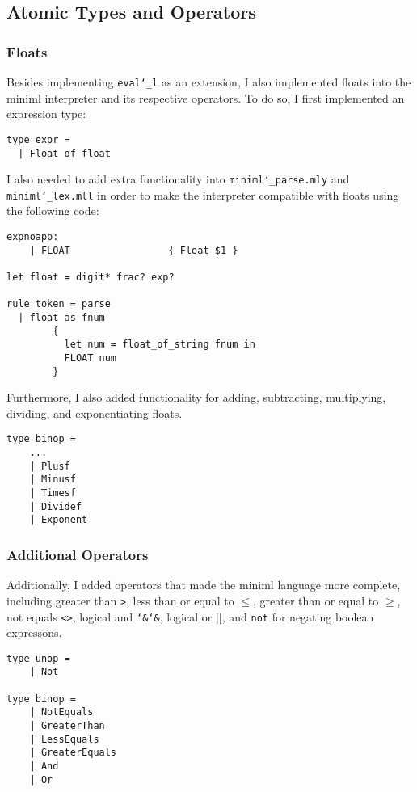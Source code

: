 \documentclass{article}
\begin{document}
\subsection{Atomic Types and Operators}

\subsubsection{Floats}

Besides implementing \texttt{eval\char`_l} as an extension, I also implemented floats into the miniml interpreter and its respective operators. To do so, I first implemented an expression type:

\begin{lstlisting}
type expr =      
  | Float of float
\end{lstlisting}

I also needed to add extra functionality into \texttt{miniml\char`_parse.mly} and \texttt{miniml\char`_lex.mll} in order to make the interpreter compatible with floats using the following code:

\begin{lstlisting}
expnoapp: 
    | FLOAT                 { Float $1 }

let float = digit* frac? exp?

rule token = parse
  | float as fnum 
        {
          let num = float_of_string fnum in 
          FLOAT num
        }
\end{lstlisting}

Furthermore, I also added functionality for adding, subtracting, multiplying, dividing, and exponentiating floats.

\begin{lstlisting}
type binop =
    ...
    | Plusf
    | Minusf
    | Timesf
    | Dividef
    | Exponent
\end{lstlisting}

\subsubsection{Additional Operators}

Additionally, I added operators that made the miniml language more complete, including greater than \texttt{>}, less than or equal to $\leq$, greater than or equal to $\geq$, not equals \texttt{<>}, logical and \texttt{\char`&\char`&}, logical or $||$, and \texttt{not} for negating boolean expressons.

\begin{lstlisting}
type unop =
    | Not

type binop = 
    | NotEquals
    | GreaterThan
    | LessEquals
    | GreaterEquals
    | And
    | Or 
\end{lstlisting}
\end{document}
